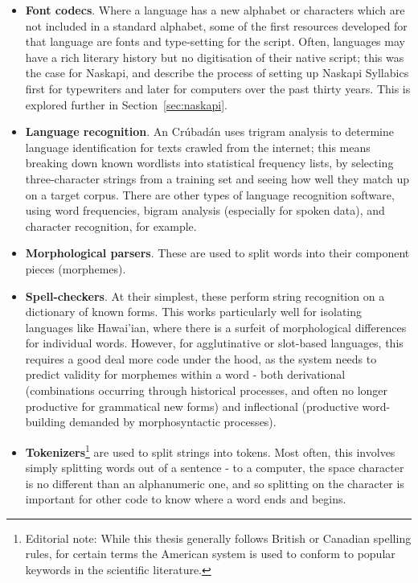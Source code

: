 \begin{itemize}
  \item \textbf{ Font codecs}. Where a language has a new alphabet or characters which are not included in a standard alphabet, some of the first resources developed for that language are fonts and type-setting for the script. Often, languages may have a rich literary history but no digitisation of their native script; this was the case for Naskapi, and \citet{jancewicz2002applied,jancewicz2012cree} describe the process of setting up Naskapi Syllabics first for typewriters and later for computers over the past thirty years. This is explored further in Section~\ref{sec:naskapi}.
  \item \textbf{Language recognition}. An Cr\'ubad\'an \citep{scannell2007crubadan} uses trigram analysis to determine language identification for texts crawled from the internet; this means breaking down known wordlists into statistical frequency lists, by selecting three-character strings from a training set and seeing how well they match up on a target corpus. There are other types of language recognition software, using word frequencies, bigram analysis (especially for spoken data), and character recognition, for example.
  \item \textbf{Morphological parsers}. These are used to split words into their component pieces (morphemes).
  \item \textbf{Spell-checkers}. At their simplest, these perform string recognition on a dictionary of known forms. This works particularly well for isolating languages like Hawai'ian, where there is a surfeit of morphological differences for individual words. However, for agglutinative or slot-based languages, this requires a good deal more code under the hood, as the system needs to predict validity for morphemes within a word - both derivational (combinations occurring through historical processes, and often no longer productive for grammatical new forms) and inflectional (productive word-building demanded by morphosyntactic processes).
  \item \textbf{Tokenizers}\footnote{Editorial note: While this thesis generally follows British or Canadian spelling rules, for certain terms the American system is used to conform to popular keywords in the scientific literature.} are used to split strings into tokens. Most often, this involves simply splitting words out of a sentence - to a computer, the space character is no different than an alphanumeric one, and so splitting on the character is important for other code to know where a word ends and begins.

\end{itemize}
